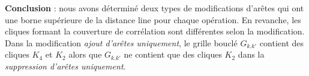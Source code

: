 {\bf Conclusion} :
nous avons d\'etermin\'e deux types de modifications d'ar\^etes qui ont une borne sup\'erieure de la distance line pour chaque op\'eration. En revanche, les cliques formant la couverture de corr\'elation sont diff\'erentes selon la modification. Dans la modification {\em ajout d'ar\^etes uniquement}, le grille boucl\'e $G_{k.k'}$ contient des cliques $K_4$ et $K_2$ alors que  $G_{k.k'}$ ne contient que des cliques $K_2$ dans la {\em suppression d'ar\^etes uniquement}. 



%
%
%
